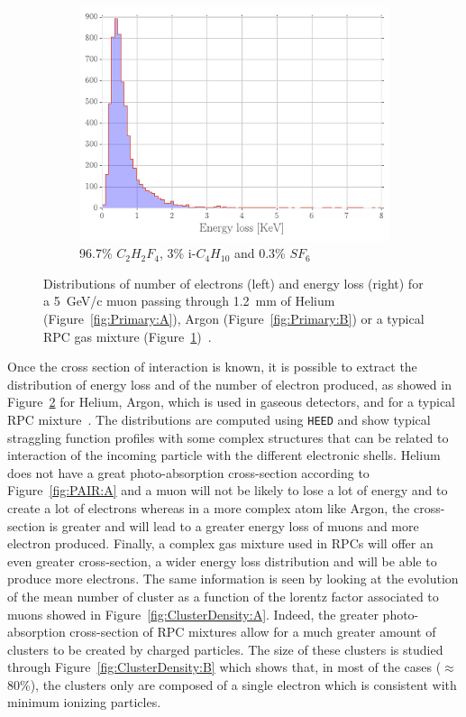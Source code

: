 \begin{figure}[H]
\begin{subfigure}{\linewidth}
			\includegraphics[width = 0.5\plotwidth]{fig/chapt4/E_loss_RPC.pdf}
			\caption{\label{fig:Primary:C} 96.7\% $C_2H_2F_4$, 3\% i-$C_4H_{10}$ and 0.3\% $SF_6$~\cite{RIEGLER2003}}
		\end{subfigure}
		\caption{\label{fig:Primary} Distributions of number of electrons (left) and energy loss (right) for a \SI{5}{GeV/c} muon passing through \SI{1.2}{mm} of Helium (Figure~\ref{fig:Primary:A}), Argon (Figure~\ref{fig:Primary:B}) or a typical RPC gas mixture (Figure~\ref{fig:Primary:C})~\cite{VINCENT2017}.}
	\end{figure}
	
	Once the cross section of interaction is known, it is possible to extract the distribution of energy loss and of the number of electron produced, as showed in Figure~\ref{fig:Primary} for Helium, Argon, which is used in gaseous detectors, and for a typical RPC mixture~\cite{VINCENT2017}. The distributions are computed using \texttt{HEED} and show typical straggling function profiles with some complex structures that can be related to interaction of the incoming particle with the different electronic shells. Helium does not have a great photo-absorption cross-section according to Figure~\ref{fig:PAIR:A} and a muon will not be likely to lose a lot of energy and to create a lot of electrons whereas in a more complex atom like Argon, the cross-section is greater and will lead to a greater energy loss of muons and more electron produced. Finally, a complex gas mixture used in RPCs will offer an even greater cross-section, a wider energy loss distribution and will be able to produce more electrons. The same information is seen by looking at the evolution of the mean number of cluster as a function of the lorentz factor associated to muons showed in Figure~\ref{fig:ClusterDensity:A}. Indeed, the greater photo-absorption cross-section of RPC mixtures allow for a much greater amount of clusters to be created by charged particles. The size of these clusters is studied through Figure~\ref{fig:ClusterDensity:B} which shows that, in most of the cases ($\approx$80\%), the clusters only are composed of a single electron which is consistent with minimum ionizing particles.
	
